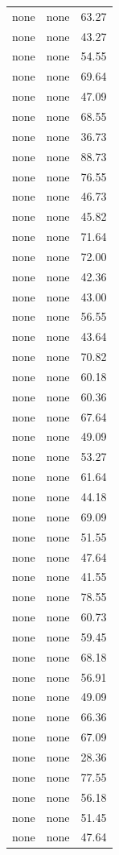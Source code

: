 \begin{tabular}{rrr}
none & none & 63.27 \\
none & none & 43.27 \\
none & none & 54.55 \\
none & none & 69.64 \\
none & none & 47.09 \\
none & none & 68.55 \\
none & none & 36.73 \\
none & none & 88.73 \\
none & none & 76.55 \\
none & none & 46.73 \\
none & none & 45.82 \\
none & none & 71.64 \\
none & none & 72.00 \\
none & none & 42.36 \\
none & none & 43.00 \\
none & none & 56.55 \\
none & none & 43.64 \\
none & none & 70.82 \\
none & none & 60.18 \\
none & none & 60.36 \\
none & none & 67.64 \\
none & none & 49.09 \\
none & none & 53.27 \\
none & none & 61.64 \\
none & none & 44.18 \\
none & none & 69.09 \\
none & none & 51.55 \\
none & none & 47.64 \\
none & none & 41.55 \\
none & none & 78.55 \\
none & none & 60.73 \\
none & none & 59.45 \\
none & none & 68.18 \\
none & none & 56.91 \\
none & none & 49.09 \\
none & none & 66.36 \\
none & none & 67.09 \\
none & none & 28.36 \\
none & none & 77.55 \\
none & none & 56.18 \\
none & none & 51.45 \\
none & none & 47.64 \\

\end{tabular}
